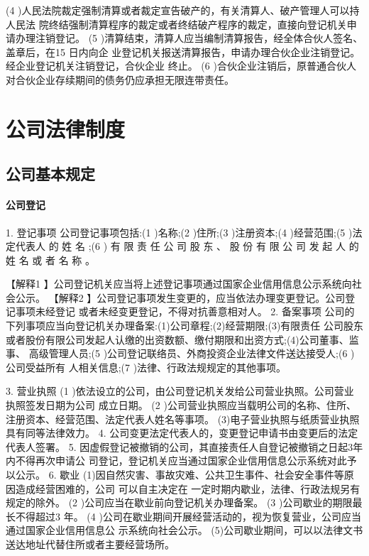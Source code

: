 \documentclass[UTF8,12pt]{ctexart}
\numberwithin{equation}{section} %
\numberwithin{figure}{section}
\numberwithin{table}{section}
\begin{document}
	 (4 )人民法院裁定强制清算或者裁定宣告破产的，有关清算人、破产管理人可以持人民法 院终结强制清算程序的裁定或者终结破产程序的裁定，直接向登记机关申请办理注销登记。 (5 )清算结束，清算人应当编制清算报告，经全体合伙人签名、盖章后，在15 日内向企 业登记机关报送清算报告，申请办理合伙企业注销登记。经企业登记机关注销登记，合伙企业 终止。
	 (6 )合伙企业注销后，原普通合伙人对合伙企业存续期间的债务仍应承担无限连带责任。
	
	    
	
	\newpage
	\section{公司法律制度}
	\subsection{公司基本规定}
	\paragraph{公司登记}
	1. 登记事项
	公司登记事项包括:(1 )名称;(2 )住所;(3 )注册资本;(4 )经营范围;(5 )法定代表人 的 姓 名 ;(6 ) 有 限 责 任 公 司 股 东 、 股 份 有 限 公 司 发 起 人 的 姓 名 或 者 名 称 。
	
	
	【解释1 】公司登记机关应当将上述登记事项通过国家企业信用信息公示系统向社会公示。 【解释2 】公司登记事项发生变更的，应当依法办理变更登记。公司登记事项未经登记 或者未经变更登记，不得对抗善意相对人。
	2. 备案事项 公司的下列事项应当向登记机关办理备案:(1)公司章程;(2)经营期限;(3)有限责任 公司股东或者股份有限公司发起人认缴的出资数额、缴付期限和出资方式;(4)公司董事、监事、 高级管理人员;(5 )公司登记联络员、外商投资企业法律文件送达接受人;(6 )公司受益所有 人相关信息;(7 )法律、行政法规规定的其他事项。
	
	3. 营业执照
	(1 )依法设立的公司，由公司登记机关发给公司营业执照。公司营业执照签发日期为公司 成立日期。
	(2 )公司营业执照应当载明公司的名称、住所、注册资本、经营范围、法定代表人姓名等事项。 (3)电子营业执照与纸质营业执照具有同等法律效力。
	4. 公司变更法定代表人的，变更登记申请书由变更后的法定代表人签署。
	5. 因虚假登记被撤销的公司，其直接责任人自登记被撤销之日起3年内不得再次申请公 司登记，登记机关应当通过国家企业信用信息公示系统对此予以公示。
	6. 歇业 (1)因自然灾害、事故灾难、公共卫生事件、社会安全事件等原因造成经营困难的，公司 可以自主决定在 一定时期内歇业，法律、行政法规另有规定的除外。
	(2 )公司应当在歇业前向登记机关办理备案。
	(3 )公司歇业的期限最长不得超过3 年。
	(4 )公司在歇业期间开展经营活动的，视为恢复营业，公司应当通过国家企业信用信息公 示系统向社会公示。 (5)公司歇业期间，可以以法律文书送达地址代替住所或者主要经营场所。
	
\end{document}
